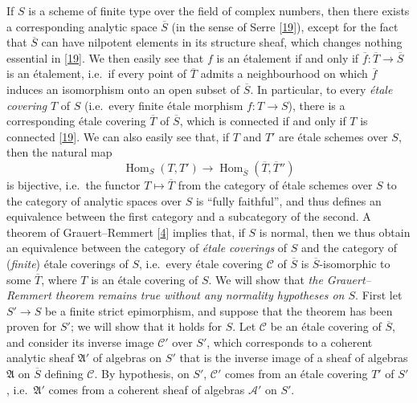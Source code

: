 \documentclass{article}
\newcommand{\oldpage}[1]{\marginpar{\footnotesize$\Big\vert$ \textit{p.~#1}}}
\theoremstyle{definition}
\theoremstyle{definition}
\theoremstyle{definition}
\theoremstyle{definition}
\theoremstyle{remark}
\begin{document}
If \(S\) is a scheme of finite type over the field of complex numbers, then there exists a corresponding analytic space \(\overline{S}\) (in the sense of Serre {[}\protect\hyperlink{ref-Ser1956}{19}{]}), except for the fact that \(\overline{S}\) can have nilpotent elements in its structure sheaf, which changes nothing essential in {[}\protect\hyperlink{ref-Ser1956}{19}{]}.
We then easily see that \(f\) is an étalement if and only if \(\overline{f}\colon\overline{T}\to\overline{S}\) is an étalement, i.e.~if every point of \(\overline{T}\) admits a neighbourhood on which \(\overline{f}\) induces an isomorphism onto an open subset of \(\overline{S}\).
In particular, to every \emph{étale covering} \(T\) of \(S\) (i.e.~every finite étale morphism \(f\colon T\to S\)), there is a corresponding étale covering \(\overline{T}\) of \(\overline{S}\), which is connected if and only if \(T\) is connected {[}\protect\hyperlink{ref-Ser1956}{19}{]}.
We can also easily see that, if \(T\) and \(T'\) are étale schemes over \(S\), then the natural map
\[
  \operatorname{Hom}_S(T,T') \to \operatorname{Hom}_{\overline{S}}(\overline{T},\overline{T}'')
\]
is bijective, i.e.~the functor \(T\mapsto\overline{T}\) from the category of étale schemes over \(S\) to the category of analytic spaces over \(S\) is ``fully faithful'', and thus defines an equivalence between the first category and a subcategory of the second.
A theorem of Grauert--Remmert {[}\protect\hyperlink{ref-GR1958}{4}{]} implies that, if \(S\) is normal, then we thus obtain an equivalence between the category of \emph{étale coverings} of \(S\) and the category of (\emph{finite}) étale coverings of \(S\), i.e.~every étale covering \({\mathscr{C}}\) of \(\overline{S}\) is \(\overline{S}\)-isomorphic to some \(\overline{T}\), where \(T\) is an étale covering of \(S\).
We will show that \emph{the Grauert--Remmert theorem remains true without any normality hypotheses on \(S\)}.
\oldpage{190-11}First let \(S'\to S\) be a finite strict epimorphism, and suppose that the theorem has been proven for \(S'\); we will show that it holds for \(S\).
Let \({\mathscr{C}}\) be an étale covering of \(\overline{S}\), and consider its inverse image \({\mathscr{C}}'\) over \(S'\), which corresponds to a coherent analytic sheaf \({\mathfrak{A}}'\) of algebras on \(S'\) that is the inverse image of a sheaf of algebras \({\mathfrak{A}}\) on \(\overline{S}\) defining \({\mathscr{C}}\).
By hypothesis, on \(S'\), \({\mathscr{C}}'\) comes from an étale covering \(T'\) of \(S'\), i.e.~\({\mathfrak{A}}'\) comes from a coherent sheaf of algebras \({\mathscr{A}}'\) on \(S'\).
\end{document}

